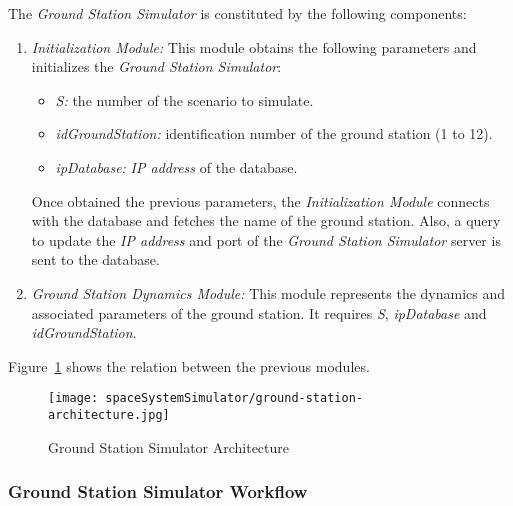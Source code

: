 The \emph{Ground Station Simulator} is constituted by the following components:
\begin{enumerate}
\item \emph{Initialization Module:} This module obtains the following parameters
  and   initializes the \emph{Ground Station Simulator}:
\begin{itemize}
\item \emph{S:} the number of the scenario to simulate.
\item \emph{idGroundStation:} identification number of the ground station (1 to 12).
\item \emph{ipDatabase:} \emph{IP address} of the database.
\end{itemize}

Once obtained the previous parameters, the \emph{Initialization Module} connects
with the database and fetches the name of the ground station. Also, a query to
update the \emph{IP address} and port of the \emph{Ground Station Simulator} server is sent to the database.
\item \emph{Ground Station Dynamics Module:} This module represents the dynamics and associated parameters of the ground station. It requires \emph{S}, \emph{ipDatabase} and \emph{idGroundStation}.
\end{enumerate}
Figure~\ref{fig:sss-ground-station-architecture} shows the relation between the previous modules.
 
\begin{figure}[!h]
\begin{center}
\texttt{[image: spaceSystemSimulator/ground-station-architecture.jpg]}
\caption{Ground Station Simulator Architecture}
\label{fig:sss-ground-station-architecture}
\end{center}
\end{figure}

\subsubsection{Ground Station Simulator Workflow}

